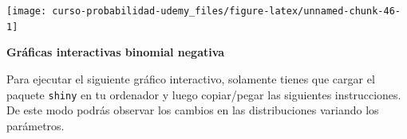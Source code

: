 \documentclass[]{book}
\newenvironment{Shaded}{\begin{snugshade}}{\end{snugshade}}
\newcommand{\DataTypeTok}[1]{\textcolor[rgb]{0.13,0.29,0.53}{#1}}
\newcommand{\DecValTok}[1]{\textcolor[rgb]{0.00,0.00,0.81}{#1}}
\newcommand{\FloatTok}[1]{\textcolor[rgb]{0.00,0.00,0.81}{#1}}
\newcommand{\KeywordTok}[1]{\textcolor[rgb]{0.13,0.29,0.53}{\textbf{#1}}}
\newcommand{\NormalTok}[1]{#1}
\newcommand{\OperatorTok}[1]{\textcolor[rgb]{0.81,0.36,0.00}{\textbf{#1}}}
\newcommand{\StringTok}[1]{\textcolor[rgb]{0.31,0.60,0.02}{#1}}
\begin{document}
\begin{center}\texttt{[image: curso-probabilidad-udemy\_files/figure-latex/unnamed-chunk-46-1]} \end{center}

\textbf{Gráficas interactivas binomial negativa}

Para ejecutar el siguiente gráfico interactivo, solamente tienes que cargar el paquete \texttt{shiny} en tu ordenador y luego copiar/pegar las siguientes instrucciones. De este modo podrás observar los cambios en las distribuciones variando los parámetros.

\begin{Shaded}
\end{Shaded}
\end{document}
